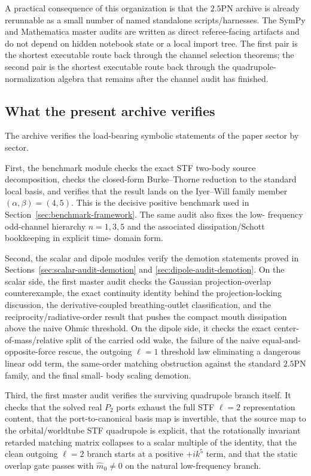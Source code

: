 \documentclass[11pt]{article}
\begin{document}
A practical consequence of this organization is that the $2.5$PN archive is
already rerunnable as a small number of named standalone scripts/harnesses.
The SymPy and Mathematica master audits are written as direct referee-facing
artifacts and do not depend on hidden notebook state or a local import tree.
The first pair is the shortest executable route back through the channel
selection theorems; the second pair is the shortest executable route back
through the quadrupole-normalization algebra that remains after the channel
audit has finished.

\subsection{What the present archive verifies}
\label{sec:verification-archive}

The archive verifies the load-bearing symbolic statements of the paper sector by
sector.

First, the benchmark module checks the exact STF two-body source decomposition,
checks the closed-form Burke--Thorne reduction to the standard local basis, and verifies
that the result lands on the Iyer--Will family member
\((\alpha,\beta)=(4,5)\).  This is the decisive positive benchmark used in
Section~\ref{sec:benchmark-framework}.  The same audit also fixes the low-
frequency odd-channel hierarchy
\(n=1,3,5\) and the associated dissipation/Schott bookkeeping in explicit time-
domain form.

Second, the scalar and dipole modules verify the demotion statements proved in
Sections~\ref{sec:scalar-audit-demotion} and
\ref{sec:dipole-audit-demotion}.  On the scalar side, the first master audit
checks the Gaussian projection-overlap counterexample, the exact continuity
identity behind the projection-locking discussion, the derivative-coupled
breathing-outlet classification, and the reciprocity/radiative-order result that
pushes the compact mouth dissipation above the naive Ohmic threshold.  On the
dipole side, it checks the exact center-of-mass/relative split of the carried odd
wake, the failure of the naive equal-and-opposite-force rescue, the outgoing
$\ell=1$ threshold law eliminating a dangerous linear odd term, the same-order
matching obstruction against the standard $2.5$PN family, and the final small-
body scaling demotion.

Third, the first master audit verifies the surviving quadrupole branch itself.
It checks that the solved real $P_2$ ports exhaust the full STF $\ell=2$
representation content, that the port-to-canonical basis map is invertible, that
the source map to the orbital/worldtube STF quadrupole is explicit, that the
rotationally invariant retarded matching matrix collapses to a scalar multiple of
the identity, that the clean outgoing $\ell=2$ branch starts at a positive
\(+i k^5\) term, and that the static overlap gate passes with
\(\hat m_0\neq 0\) on the natural low-frequency branch.
\end{document}
